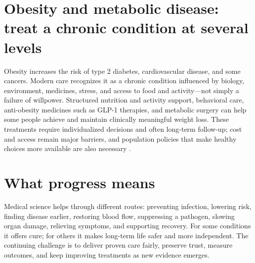 \documentclass[12pt,oneside]{book}
\begin{document}
\section{Obesity and metabolic disease: treat a chronic condition at several levels}
Obesity increases the risk of type 2 diabetes, cardiovascular disease, and
some cancers. Modern care recognizes it as a chronic condition influenced by
biology, environment, medicines, stress, and access to food and activity—not
simply a failure of willpower. Structured nutrition and activity support,
behavioral care, anti-obesity medicines such as GLP-1 therapies, and metabolic
surgery can help some people achieve and maintain clinically meaningful
weight loss. These treatments require individualized decisions and often
long-term follow-up; cost and access remain major barriers, and population
policies that make healthy choices more available are also necessary
\cite{whoObesity2025,whoObesity2026}.

\section{What progress means}
Medical science helps through different routes: preventing infection,
lowering risk, finding disease earlier, restoring blood flow, suppressing a
pathogen, slowing organ damage, relieving symptoms, and supporting recovery.
For some conditions it offers cure; for others it makes long-term life safer
and more independent. The continuing challenge is to deliver proven care
fairly, preserve trust, measure outcomes, and keep improving treatments as
new evidence emerges.

\backmatter
\end{document}
